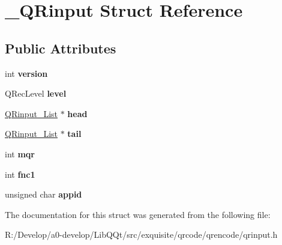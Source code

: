 \hypertarget{struct___q_rinput}{}\section{\+\_\+\+Q\+Rinput Struct Reference}
\label{struct___q_rinput}
\subsection*{Public Attributes}
\begin{DoxyCompactItemize}
\item 
\mbox{\label{struct___q_rinput_a4f6567d11fd6301d4efd0daa27481676}} 
int {\bfseries version}
\item 
\mbox{\label{struct___q_rinput_a7fe3d6d3b406da8f59726fbc2349ba35}} 
Q\+Rec\+Level {\bfseries level}
\item 
\mbox{\label{struct___q_rinput_a481ad94ce05c3a74804f1633f8a09cf8}} 
\mbox{\hyperlink{struct___q_rinput___list}{Q\+Rinput\+\_\+\+List}} $\ast$ {\bfseries head}
\item 
\mbox{\label{struct___q_rinput_a9809b55019593773843ffafdba75f6f0}} 
\mbox{\hyperlink{struct___q_rinput___list}{Q\+Rinput\+\_\+\+List}} $\ast$ {\bfseries tail}
\item 
\mbox{\label{struct___q_rinput_a27c768c625ce9c3a0a25efb7161d3ce3}} 
int {\bfseries mqr}
\item 
\mbox{\label{struct___q_rinput_a20a0cfbc9a92db94643981c9d0228abb}} 
int {\bfseries fnc1}
\item 
\mbox{\label{struct___q_rinput_aaa9a01082553cade177986ad7ffee5a1}} 
unsigned char {\bfseries appid}
\end{DoxyCompactItemize}


The documentation for this struct was generated from the following file\+:\begin{DoxyCompactItemize}
\item 
R\+:/\+Develop/a0-\/develop/\+Lib\+Q\+Qt/src/exquisite/qrcode/qrencode/qrinput.\+h\end{DoxyCompactItemize}
